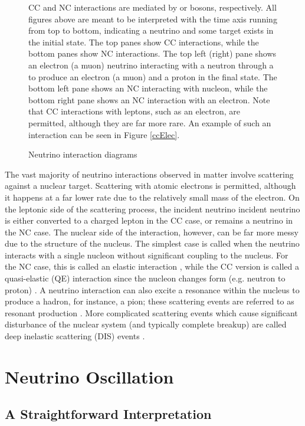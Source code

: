 \begin{figure}
\begin{center}
\end{center}
\caption{Neutrino interaction diagrams}{
CC and NC interactions are mediated by \wb or \zb bosons, respectively.
All figures above are meant to be interpreted with the time axis running from
top to bottom, indicating a neutrino and some target exists
in the initial state.
The top panes show CC interactions, while the bottom panes show NC interactions.
The top left (right) pane shows an electron (a muon) neutrino interacting with
a neutron through a \wb
to produce an electron (a muon) and a proton in the final state.
The bottom left pane shows an NC interacting with nucleon, while
the bottom right pane shows an NC interaction with an electron.
Note that CC interactions with leptons, such as an electron, are permitted,
although they are far more rare.
An example of such an interaction can be seen in Figure \ref{ccElec}.
}
\label{nuInt}
\end{figure}

The vast majority of neutrino interactions observed in matter involve
scattering against a nuclear target.
Scattering with atomic electrons is permitted, although it happens at a
far lower rate due to the relatively small mass of the electron.
On the leptonic side of the scattering process, the incident neutrino
incident neutrino is either converted to a charged lepton in the CC case,
or remains a neutrino in the NC case.
The nuclear side of the interaction, however, can be far more messy
due to the structure of the nucleus.
The simplest case is called when the neutrino interacts with a
single nucleon without significant coupling to the nucleus.
For the NC case, this is called an elastic interaction
\cite{fuess1981neutrino}, while the CC version
is called a quasi-elastic (QE) interaction since the nucleon changes form
(e.g. neutron to proton) \cite{LlewellynSmith}.
A neutrino interaction can also excite a resonance within the nucleus to
produce a hadron, for instance, a pion;
these scattering events are referred to as resonant production
\cite{rein1981neutrino}.
More complicated scattering events which cause significant disturbance of the
nuclear system (and typically complete breakup) are called deep inelastic
scattering (DIS) events \cite{lee1957parity,whitlow1990precise,aivazis1994leptoproduction}.


\section{Neutrino Oscillation}

\subsection{A Straightforward Interpretation}

